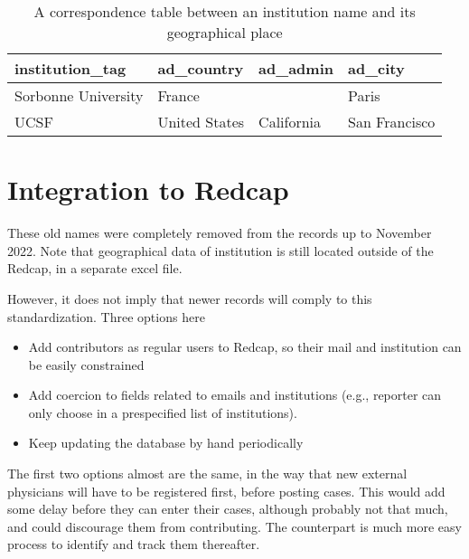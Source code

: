 \documentclass[
]{book}
\begin{document}
\begin{table}

\caption{\label{tab:unnamed-chunk-11}A correspondence table between an institution name and its geographical place}
\centering
\begin{tabular}[t]{l|l|l|l}
\hline
institution\_tag & ad\_country & ad\_admin & ad\_city\\
\hline
Sorbonne University & France &  & Paris\\
\hline
UCSF & United States & California & San Francisco\\
\hline
\end{tabular}
\end{table}

\hypertarget{integration-to-redcap}{%
\section{Integration to Redcap}\label{integration-to-redcap}}

These old names were completely removed from the records up to November 2022. Note that geographical data of institution is still located outside of the Redcap, in a separate excel file.

However, it does not imply that newer records will comply to this standardization. Three options here

\begin{itemize}
\item
  Add contributors as regular users to Redcap, so their mail and institution can be easily constrained
\item
  Add coercion to fields related to emails and institutions (e.g., reporter can only choose in a prespecified list of institutions).
\item
  Keep updating the database by hand periodically
\end{itemize}

The first two options almost are the same, in the way that new external physicians will have to be registered first, before posting cases. This would add some delay before they can enter their cases, although probably not that much, and could discourage them from contributing. The counterpart is much more easy process to identify and track them thereafter.

  
\end{document}
